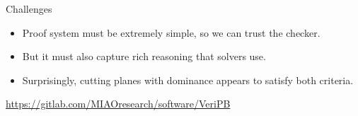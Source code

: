 \documentclass[aspectratio=169,compress,10pt]{beamer}
\begin{document}
\begin{frame}{Challenges}
    \begin{itemize}
        \item Proof system must be extremely simple, so we can trust the checker.
        \item But it must also capture rich reasoning that solvers use.
            \pause
        \item Surprisingly, cutting planes with dominance appears to satisfy both criteria.
    \end{itemize}

    \bigskip

    \begin{center}
        \url{https://gitlab.com/MIAOresearch/software/VeriPB}
    \end{center}
\end{frame}
\end{document}
